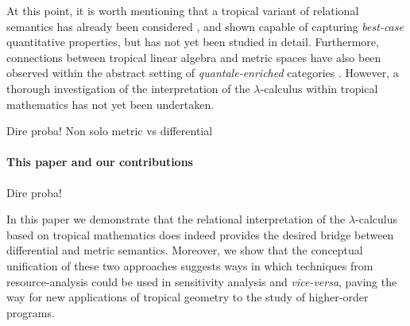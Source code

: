 At this point, it is worth mentioning that a tropical variant of relational semantics has already been considered \cite{Manzo2013}, and shown capable of capturing \emph{best-case} quantitative properties, but has not yet been studied in detail. Furthermore, connections between tropical linear algebra and metric spaces have also been observed \cite{Fuji} within the abstract setting of \emph{quantale-enriched} categories \cite{Hofmann2014, Stubbe2014}.
However, a thorough investigation of the interpretation of the $\lambda$-calculus within tropical mathematics has not yet been undertaken. 

{\color{red}Dire proba! Non solo metric vs differential}


\paragraph*{This paper and our contributions}

{\color{red}Dire proba!}

In this paper we demonstrate that the relational interpretation of the $\lambda$-calculus based on tropical mathematics does indeed provides the desired bridge between differential and metric semantics. Moreover, we show that the conceptual unification of these two approaches suggests ways in which techniques from resource-analysis could be used in sensitivity analysis and \emph{vice-versa}, paving the way for new  applications of tropical geometry to the  study of higher-order programs.

